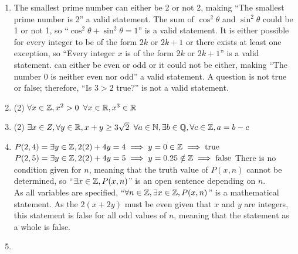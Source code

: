 \documentclass[../MATH135.tex]{subfiles}
\begin{document}
		\begin{enumerate}
			\item
				\begin{tasks}
					\task
						The smallest prime number can either be 2 or not 2, making \enquote{The smallest prime number is 2} a valid statement.
					\task
						The sum of \(\cos^2\theta\) and \(\sin^2\theta\) could be 1 or not 1, so \enquote{\(\cos^2\theta + \sin^2\theta = 1\)} is a valid statement.
					\task
						It is either possible for every integer to be of the form \(2k\) or \(2k + 1\) or there exists at least one exception, so \enquote{Every integer \(x\) is of the form \(2k\) or \(2k + 1\)} is a valid statement.
					 can either be even or odd or it could not be either, making \enquote{The number 0 is neither even nor odd} a valid statement.
					\task
						A question is not true or false; therefore, \enquote{Is \(3 > 2\) true?} is not a valid statement.
				\end{tasks}
			\item
				\begin{tasks}(2)
					\task
						\(\forall x \in \mathbb{Z}, x^2 > 0\)
					\task
						\(\forall x \in \mathbb{R}, x^3 \in \mathbb{R}\)				
				\end{tasks}
			\item
				\begin{tasks}(2)
					\task
						\(\exists x \in Z, \forall y \in \mathbb{R}, x + y \ge 3\sqrt{2}\)
					\task
						\(\forall a \in \mathbb{N}, \exists b \in \mathbb{Q}, \forall c \in \mathbb{Z}, a = b - c\)
				\end{tasks}
			\item
				\begin{tasks}
					\task	
						\(P(2, 4) = \exists y \in \mathbb{Z}, 2(2) + 4y = 4 \implies y = 0 \in \mathbb{Z} \implies \text{true}\) \\
						\(P(2, 5) = \exists y \in \mathbb{Z}, 2(2) + 4y = 5 \implies y = 0.25 \notin \mathbb{Z} \implies \text{false}\)
					\task
						There is no condition given for \(n\), meaning that the truth value of \(P(x, n)\) cannot be determined, so \enquote{\(\exists x \in \mathbb{Z}, P(x, n)\)} is an open sentence depending on \(n\). \\
					\task
						As all variables are specified, \enquote{\(\forall n \in \mathbb{Z}, \exists x \in \mathbb{Z}, P(x, n)\)} is a mathematical statement. As the \(2(x + 2y)\) must be even given that \(x\) and \(y\) are integers, this statement is false for all odd values of \(n\), meaning that the statement as a whole is false.
				\end{tasks}
			\item

\end{enumerate}
\end{document}
